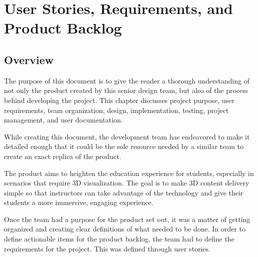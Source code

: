 
\chapter{User Stories,  Requirements, and Product Backlog}



\section{Overview}


The purpose of this document is to give the reader a thorough understanding of
not only the product created by this senior design team, but also of the
process behind developing the project. This chapter discusses project purpose, user
requirements, team organization, design, implementation, testing, project
management, and user documentation.

While creating this document, the development team has endeavored to make it detailed enough that it could be the sole resource needed by a similar team to create an exact replica of the product.

The product aims to heighten the education experience for
students, especially in scenarios that require 3D visualization. The goal is to
make 3D content delivery simple so that instructors can take advantage of the
technology and give their students a more immersive, engaging experience.

Once the team had a purpose for the product set out, it was a matter of getting
organized and creating clear definitions of what needed to be done.
In order to define actionable items for the product backlog, the team had to define
the requirements for the project. This was defined through user stories.






